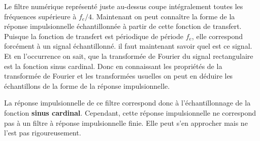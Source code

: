 \documentclass[11pt,a4paper]{article}
\begin{document}
Le filtre numérique représenté juste au-dessus coupe intégralement toutes les fréquences supérieure à $f_e/4$. Maintenant on peut connaître la forme de la réponse impulsionnelle échantillonnée à partir de cette fonction de transfert.\\

Puisque la fonction de transfert est périodique de période $f_e$, elle correspond forcément à un signal échantillonné. il faut maintenant savoir quel est ce signal. Et en l'occurrence on sait, que la transformée de  Fourier du signal rectangulaire est la fonction sinus cardinal. Donc en connaissant les propriétés de la transformée de Fourier et les transformées usuelles on peut en déduire les échantillons de la forme de la réponse impulsionnelle.\\

\begin{center}
\end{center}

La réponse impulsionnelle de ce filtre correspond donc à l'échantillonnage de la fonction \textbf{sinus cardinal}. Cependant, cette réponse impulsionnelle ne correspond pas à un filtre à réponse impulsionnelle finie. Elle peut s'en approcher mais ne l'est pas rigoureusement.\\
\end{document}
